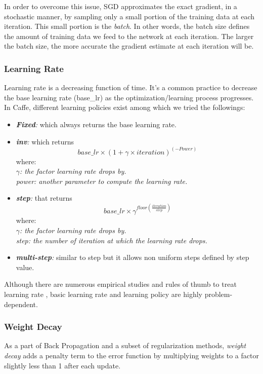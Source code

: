 \indent In order to overcome this issue, SGD approximates the exact gradient, in a stochastic manner, by sampling only a small portion of the training data at each iteration. This small portion is the \textit{batch}. In other words, the batch size defines the amount of training data we feed to the network at each iteration. The larger the batch size, the more accurate the gradient estimate at each iteration will be. 

\subsubsection{Learning Rate}
\label{learning rate}
Learning rate is a decreasing function of time. It's a common practice to decrease the base learning rate (base\_lr) as the optimization/learning process progresses. In Caffe, different learning policies exist among which we tried the followings:
\begin{itemize}
\item \textit{\textbf{Fixed}:} which always returns the base learning rate.

\item \textit{\textbf{inv}:} which returns $$base\_lr \times (1 + \gamma \times iteration) ^ {(-Power)}$$ where:\\\textit{ $\gamma$: the factor learning rate drops by.}\\\textit{power: another parameter to compute the learning rate.}

\item \textit{\textbf{step}:} that returns $$base\_lr \times \gamma ^ {floor(\frac{iteration}{step})}$$ where:\\ \textit{$\gamma$: the factor learning rate drops by.}\\\textit{step: the number of iteration at which the learning rate drops.} 
\item \textit{\textbf{multi-step}:} similar to step but it allows non uniform steps defined by step value.
\end{itemize}
Although there are numerous empirical studies and rules of thumb to treat learning rate \cite{senior2013empirical,yu1995dynamic,minai1990acceleration}, basic learning rate and learning policy are highly problem-dependent.  

\subsubsection{Weight Decay}


As a part of Back Propagation and a subset of regularization methods, \textit{weight decay} adds a penalty term to the error function by multiplying weights to a factor slightly less than 1 after each update. 

